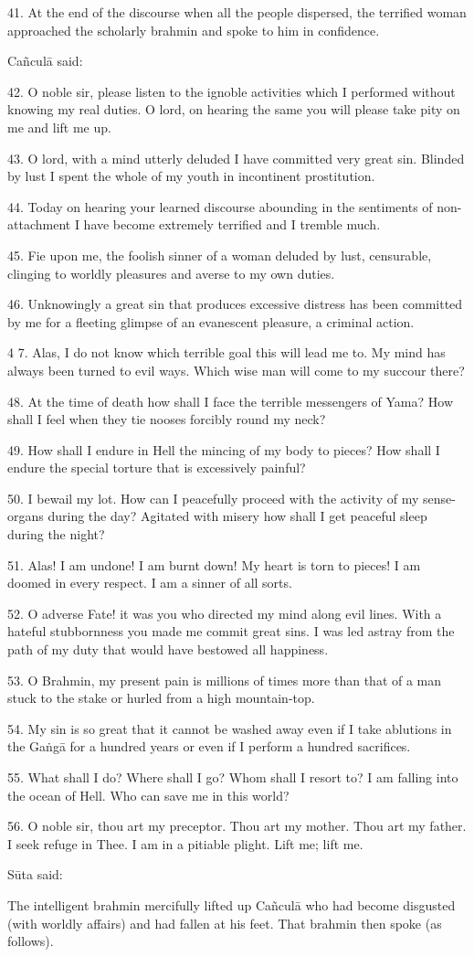 41. At the end of the discourse when all the people dispersed, the terrified
woman approached the scholarly brahmin and spoke to him in confidence.

Cañculā said:

42. O noble sir, please listen to the ignoble activities which I performed
without knowing my real duties. O lord, on hearing the same you will please take
pity on me and lift me up.

43. O lord, with a mind utterly deluded I have committed very great sin. Blinded
by lust I spent the whole of my youth in incontinent prostitution.

44. Today on hearing your learned discourse abounding in the sentiments of
non-attachment I have become extremely terrified and I tremble much.

45. Fie upon me, the foolish sinner of a woman deluded by lust, censurable,
clinging to worldly pleasures and averse to my own duties.

46. Unknowingly a great sin that produces excessive distress has been committed
by me for a fleeting glimpse of an evanescent pleasure, a criminal action.

4 7. Alas, I do not know which terrible goal this will lead me to. My mind has
always been turned to evil ways. Which wise man will come to my succour there?

48. At the time of death how shall I face the terrible messengers of Yama? How
shall I feel when they tie nooses forcibly round my neck?

49. How shall I endure in Hell the mincing of my body to pieces? How shall I
endure the special torture that is excessively painful?

50. I bewail my lot. How can I peacefully proceed with the activity of my
sense-organs during the day? Agitated with misery how shall I get peaceful sleep
during the night?

51. Alas! I am undone! I am burnt down! My heart is torn to pieces! I am doomed
in every respect. I am a sinner of all sorts.

52. O adverse Fate! it was you who directed my mind along evil lines. With a
hateful stubbornness you made me commit great sins. I was led astray from the
path of my duty that would have bestowed all happiness.

53. O Brahmin, my present pain is millions of times more than that of a man
stuck to the stake or hurled from a high mountain-top.

54. My sin is so great that it cannot be washed away even if I take ablutions in
the Gaṅgā for a hundred years or even if I perform a hundred sacrifices.

55. What shall I do? Where shall I go? Whom shall I resort to? I am falling into
the ocean of Hell. Who can save me in this world?

56. O noble sir, thou art my preceptor. Thou art my mother. Thou art my father.
I seek refuge in Thee. I am in a pitiable plight. Lift me; lift me.

Sūta said:

The intelligent brahmin mercifully lifted up Cañculā who had become disgusted
(with worldly affairs) and had fallen at his feet. That brahmin then spoke
(as follows).
